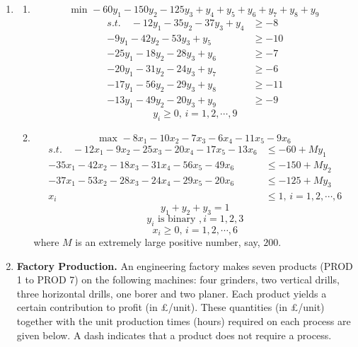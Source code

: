 \documentclass[12pt,a4paper]{article}
\makeatletter
\newtheorem*{solution}{Solution}
\theoremstyle{definition}
\renewenvironment{solution}[1][Solution] {\par\pushQED{\qed}\normalfont\topsep6\p@\@plus6\p@\relax\trivlist\item[\hskip\labelsep\bfseries#1\@addpunct{.}]\ignorespaces}{\popQED\endtrivlist\@endpefalse} \makeatother
\makeatother
\begin{document}
\begin{enumerate}
\begin{solution}
\begin{enumerate}
    		\item
    		\[\text{min } -60y_1 - 150y_2 - 125y_3 + y_4 + y_5 + y_6 + y_7 + y_8 + y_9\]
    		\begin{align*}
	    		s.t. \quad -12y_1 - 35y_2 - 37y_3 + y_4 & \geq -8 \\
	    		-9y_1 - 42y_2 - 53y_3 + y_5 & \geq -10 \\
	    		-25y_1 - 18y_2 - 28y_3 + y_6 & \geq -7 \\
	    		-20y_1 - 31y_2 - 24y_3 + y_7 & \geq -6 \\
	    		-17y_1 - 56y_2 - 29y_3 + y_8 & \geq -11 \\
	    		-13y_1 - 49y_2 - 20y_3 + y_9 & \geq -9 	    		
    		\end{align*}
    		\[y_i \geq 0 , \, i = 1,2, \cdots , 9\]
    		
    		\item
    		\[\text{max } -8x_1 - 10x_2 - 7x_3 - 6x_4 - 11x_5 - 9x_6\]
    		\begin{align*}
    		s.t. \quad -12x_1 - 9x_2 - 25x_3 - 20x_4 - 17x_5 - 13x_6 & \leq -60 + M y_1 \\
    		-35x_1 - 42x_2 - 18x_3 - 31x_4 - 56x_5 - 49x_6 & \leq -150 + M y_2 \\
    		-37x_1 - 53x_2 - 28x_3 - 24x_4 - 29x_5 - 20x_6 & \leq -125 + M y_3 \\
    		x_i & \leq 1 , \, i = 1, 2, \cdots , 6
    		\end{align*}
    		\[y_1 + y_2 + y_3 = 1\]
    		\[y_i \text{ is binary } , i = 1,2,3\]
    		\[x_i \geq 0 , \, i = 1, 2, \cdots , 6\]
    		where $M$ is an extremely large positive number, say, $200$. 
    	\end{enumerate}
    \end{solution}
    
	\item 
	\textbf{Factory Production. }An engineering factory makes seven products (PROD 1 to PROD 7) on the following machines: four grinders, two vertical drills, three horizontal drills, one borer and two planer. Each product yields a certain contribution to profit (in \pounds/unit). These quantities (in \pounds/unit) together with the unit production times (hours) required on each process are given below. A dash indicates that a product does not require a process.
	

\end{enumerate}
\end{document}
